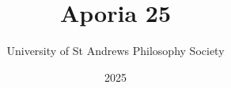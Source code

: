 \documentclass[twoside]{book}
\title{Aporia 25}
\author{University of St Andrews Philosophy Society}
\date{2025}
\begin{document}
\frontmatter




\tableofcontents

\mainmatter

  \begingroup
  \let\mathit\mathrm
  \let\mathnormal\mathrm

\endgroup



\backmatter

\cleardoublepage

\end{document}
